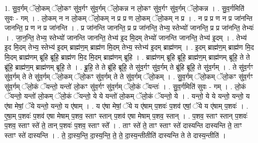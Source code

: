 \documentclass[17pt]{extarticle}
\begin{document}
1. सु॒व॒र्गम् ॅलो॒कम् ॅलो॒कꣳ सु॑व॒र्गꣳ सु॑व॒र्गम् ॅलो॒कन्न न लो॒कꣳ सु॑व॒र्गꣳ सु॑व॒र्गम् ॅलो॒कन्न । . सु॒व॒र्गमिति॑ सुवः - गम् । . लो॒कम् न न लो॒कम् ॅलो॒कम् न प्र प्र ण लो॒कम् ॅलो॒कम् न प्र । . न प्र प्र ण न प्र जा॑नन्ति जानन्ति॒ प्र ण न प्र जा॑नन्ति । . प्र जा॑नन्ति जानन्ति॒ प्र प्र जा॑नन्ति॒ तेभ्य॒ स्तेभ्यो॑ जानन्ति॒ प्र प्र जा॑नन्ति॒ तेभ्यः॑ । . जा॒न॒न्ति॒ तेभ्य॒ स्तेभ्यो॑ जानन्ति जानन्ति॒ तेभ्य॑ इ॒द मि॒दम् तेभ्यो॑ जानन्ति जानन्ति॒ तेभ्य॑ इ॒दम् । . तेभ्य॑ इ॒द मि॒दम् तेभ्य॒ स्तेभ्य॑ इ॒दम् ब्राह्म॑ण॒म् ब्राह्म॑ण मि॒दम् तेभ्य॒ स्तेभ्य॑ इ॒दम् ब्राह्म॑णम् । . इ॒दम् ब्राह्म॑ण॒म् ब्राह्म॑ण मि॒द मि॒दम् ब्राह्म॑णम् ब्रूहि ब्रूहि॒ ब्राह्म॑ण मि॒द मि॒दम् ब्राह्म॑णम् ब्रूहि । . ब्राह्म॑णम् ब्रूहि ब्रूहि॒ ब्राह्म॑ण॒म् ब्राह्म॑णम् ब्रूहि॒ ते ते ब्रू॑हि॒ ब्राह्म॑ण॒म् ब्राह्म॑णम् ब्रूहि॒ ते । . ब्रू॒हि॒ ते ते ब्रू॑हि ब्रूहि॒ ते सु॑व॒र्गꣳ सु॑व॒र्गम् ते ब्रू॑हि ब्रूहि॒ ते सु॑व॒र्गम् । . ते सु॑व॒र्गꣳ सु॑व॒र्गम् ते ते सु॑व॒र्गम् ॅलो॒कम् ॅलो॒कꣳ सु॑व॒र्गम् ते ते सु॑व॒र्गम् ॅलो॒कम् । . सु॒व॒र्गम् ॅलो॒कम् ॅलो॒कꣳ सु॑व॒र्गꣳ सु॑व॒र्गम् ॅलो॒कं ॅयन्तो॒ यन्तो॑ लो॒कꣳ सु॑व॒र्गꣳ सु॑व॒र्गम् ॅलो॒कं ॅयन्तः॑ । . सु॒व॒र्गमिति॑ सुवः - गम् । . लो॒कं ॅयन्तो॒ यन्तो॑ लो॒कम् ॅलो॒कं ॅयन्तो॒ ये ये यन्तो॑ लो॒कम् ॅलो॒कं ॅयन्तो॒ ये । . यन्तो॒ ये ये यन्तो॒ यन्तो॒ य ए॑षा मेषां॒ ॅये यन्तो॒ यन्तो॒ य ए॑षाम् । . य ए॑षा मेषां॒ ॅये य ए॑षाम् प॒शवः॑ प॒शव॑ एषां॒ ॅये य ए॑षाम् प॒शवः॑ । . ए॒षा॒म् प॒शवः॑ प॒शव॑ एषा मेषाम् प॒शव॒ स्ताꣳ स्तान् प॒शव॑ एषा मेषाम् प॒शव॒ स्तान् । . प॒शव॒ स्ताꣳ स्तान् प॒शवः॑ प॒शव॒ स्ताꣳ स्ते॑ ते॒ तान् प॒शवः॑ प॒शव॒ स्ताꣳ स्ते᳚ । . ताꣳ स्ते॑ ते॒ ताꣳ स्ताꣳ स्ते॑ दास्यन्ति दास्यन्ति ते॒ ताꣳ स्ताꣳ स्ते॑ दास्यन्ति । . ते॒ दा॒स्य॒न्ति॒ दा॒स्य॒न्ति॒ ते॒ ते॒ दा॒स्य॒न्तीतीति॑ दास्यन्ति ते ते दास्य॒न्तीति॑ । \newline
\end{document}
